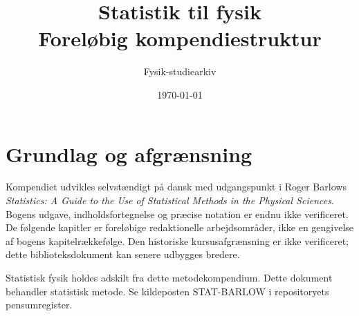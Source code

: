 \documentclass[11pt,a4paper,oneside]{book}
\title{Statistik til fysik\\[4mm]\large Foreløbig kompendiestruktur}
\author{Fysik-studiearkiv}
\date{\today}
\begin{document}
\frontmatter
\maketitle
\chapter*{Grundlag og afgrænsning}
Kompendiet udvikles selvstændigt på dansk med udgangspunkt i Roger Barlows
\emph{Statistics: A Guide to the Use of Statistical Methods in the Physical Sciences}.
Bogens udgave, indholdsfortegnelse og præcise notation er endnu ikke verificeret.
De følgende kapitler er foreløbige redaktionelle arbejdsområder, ikke en gengivelse
 af bogens kapitelrækkefølge. Den historiske kursusafgrænsning er ikke verificeret; dette biblioteksdokument kan senere udbygges bredere.

Statistisk fysik holdes adskilt fra dette metodekompendium. Dette dokument behandler
statistisk metode. Se kildeposten STAT-BARLOW i repositoryets pensumregister.
\tableofcontents
\mainmatter






\end{document}
